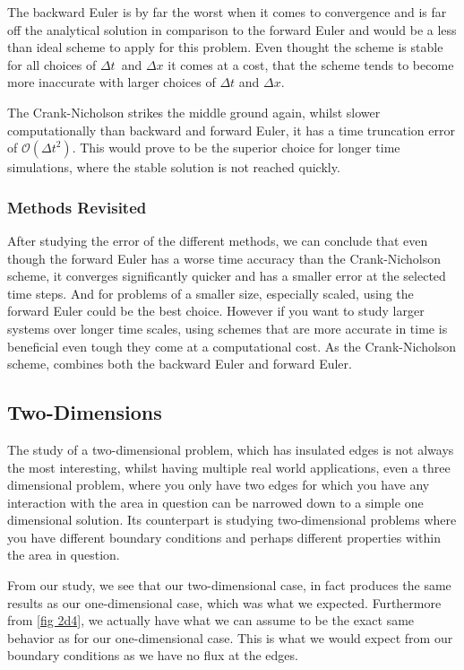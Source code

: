 \documentclass[%
reprint,
nofootinbib,
amsmath,amssymb,
aps,
]{revtex4-1}
\newcommand{\dt}{{\Delta t}}
\newcommand{\dx}{{\Delta x}}
\begin{document}
The backward Euler is by far the worst when it comes to convergence and is far off the analytical solution in comparison to the forward Euler and would be a less than ideal scheme to apply for this problem. Even thought the scheme is stable for all choices of $\dt$ and $\dx$ it comes at a cost, that the scheme tends to become more inaccurate with larger choices of $\dt$ and $\dx$. 

The Crank-Nicholson strikes the middle ground again, whilst slower computationally than backward and forward Euler, it has a time truncation error of $\mathcal{O}(\dt^2)$. This would prove to be the superior choice for longer time simulations, where the stable solution is not reached quickly. 


\subsubsection{Methods Revisited}
After studying the error of the different methods, we can conclude that even though the forward Euler has a worse time accuracy than the Crank-Nicholson scheme, it converges significantly quicker and has a smaller error at the selected time steps. And for problems of a smaller size, especially scaled, using the forward Euler could be the best choice. However if you want to study larger systems over longer time scales, using schemes that are more accurate in time is beneficial even tough they come at a computational cost. As the Crank-Nicholson scheme, combines both the backward Euler and forward Euler. 

\subsection{Two-Dimensions}
The study of a two-dimensional problem, which has insulated edges is not always the most interesting, whilst having multiple real world applications, even a three dimensional problem, where you only have two edges for which you have any interaction with the area in question can be narrowed down to a simple one dimensional solution. Its counterpart is studying two-dimensional problems where you have different boundary conditions and perhaps different properties within the area in question.

From our study, we see that our two-dimensional case, in fact produces the same results as our one-dimensional case, which was what we expected. Furthermore from \autoref{fig 2d4}, we actually have what we can assume to be the exact same behavior as for our one-dimensional case. This is what we would expect from our boundary conditions as we have no flux at the edges. 
\end{document}
